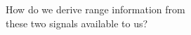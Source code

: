 \documentclass[preview]{standalone}
\begin{document}
\begin{center}
How do we derive range information from\\these two signals available to us?
\end{center}
\end{document}
